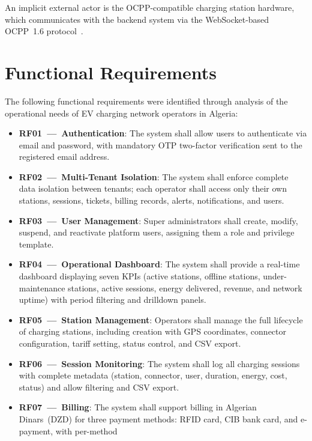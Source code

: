 \documentclass[12pt,a4paper]{report}
\begin{document}
An implicit external actor is the OCPP-compatible charging station hardware, which communicates
with the backend system via the WebSocket-based OCPP~1.6 protocol~\autocite{ocpp16_ed2}.

\section{Functional Requirements}

The following functional requirements were identified through analysis of the operational needs
of EV charging network operators in Algeria:

\begin{itemize}
  \item \textbf{RF01~---~Authentication}: The system shall allow users to authenticate via
        email and password, with mandatory OTP two-factor verification sent to the registered
        email address.
  \item \textbf{RF02~---~Multi-Tenant Isolation}: The system shall enforce complete data
        isolation between tenants; each operator shall access only their own stations, sessions,
        tickets, billing records, alerts, notifications, and users.
  \item \textbf{RF03~---~User Management}: Super administrators shall create, modify, suspend,
        and reactivate platform users, assigning them a role and privilege template.
  \item \textbf{RF04~---~Operational Dashboard}: The system shall provide a real-time dashboard
        displaying seven KPIs (active stations, offline stations, under-maintenance stations,
        active sessions, energy delivered, revenue, and network uptime) with period filtering
        and drilldown panels.
  \item \textbf{RF05~---~Station Management}: Operators shall manage the full lifecycle of
        charging stations, including creation with GPS coordinates, connector configuration,
        tariff setting, status control, and CSV export.
  \item \textbf{RF06~---~Session Monitoring}: The system shall log all charging sessions with
        complete metadata (station, connector, user, duration, energy, cost, status) and allow
        filtering and CSV export.
  \item \textbf{RF07~---~Billing}: The system shall support billing in Algerian Dinars~(DZD)
        for three payment methods: RFID card, CIB bank card, and e-payment, with per-method

\end{itemize}
\end{document}
